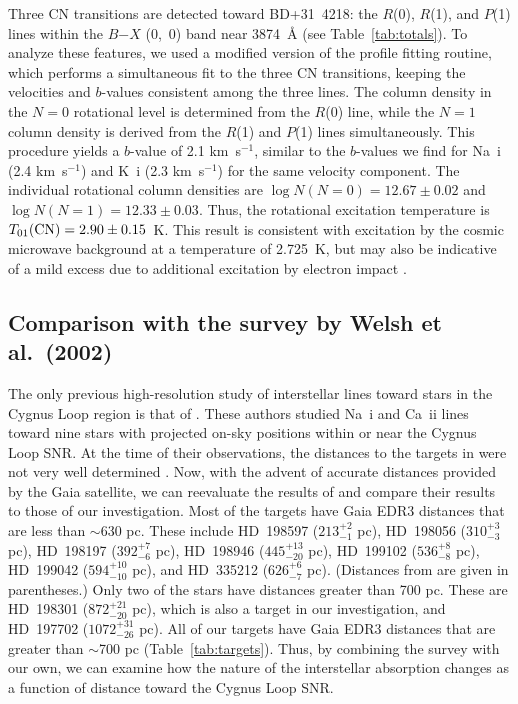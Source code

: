 \documentclass[fleqn,usenatbib]{mnras}
\begin{document}
Three CN transitions are detected toward BD+31~4218: the $R$(0), $R$(1), and $P$(1) lines within the $B$$-$$X$ (0,~0) band near 3874~\AA{} (see Table~\ref{tab:totals}). To analyze these features, we used a modified version of the profile fitting routine, which performs a simultaneous fit to the three CN transitions, keeping the velocities and $b$-values consistent among the three lines. The column density in the $N=0$ rotational level is determined from the $R$(0) line, while the $N=1$ column density is derived from the $R$(1) and $P$(1) lines simultaneously. This procedure yields a $b$-value of 2.1 km~s$^{-1}$, similar to the $b$-values we find for Na~{\sc i} (2.4 km~s$^{-1}$) and K~{\sc i} (2.3 km~s$^{-1}$) for the same velocity component. The individual rotational column densities are $\log N(N=0)=12.67\pm0.02$ and $\log N(N=1)=12.33\pm0.03$. Thus, the rotational excitation temperature is $T_{01}({\rm CN})=2.90\pm0.15$~K. This result is consistent with excitation by the cosmic microwave background at a temperature of 2.725~K, but may also be indicative of a mild excess due to additional excitation by electron impact \citep[e.g.,][]{r11}.

\subsection{Comparison with the survey by Welsh et al.~(2002)}
The only previous high-resolution study of interstellar lines toward stars in the Cygnus Loop region is that of \citet{w02}. These authors studied Na~{\sc i} and Ca~{\sc ii} lines toward nine stars with projected on-sky positions within or near the Cygnus Loop SNR. At the time of their observations, the distances to the targets in \citet{w02} were not very well determined \citep[and the targets were selected assuming the distance to the Cygnus Loop was 440 pc;][]{b99}. Now, with the advent of accurate distances provided by the Gaia satellite, we can reevaluate the results of \citet{w02} and compare their results to those of our investigation. Most of the \citet{w02} targets have Gaia EDR3 distances that are less than $\sim$630 pc. These include HD~198597 ($213^{+2}_{-1}$ pc), HD~198056 ($310^{+3}_{-3}$ pc), HD~198197 ($392^{+7}_{-6}$ pc), HD~198946 ($445^{+13}_{-20}$ pc), HD~199102 ($536^{+8}_{-8}$ pc), HD~199042 ($594^{+10}_{-10}$ pc), and HD~335212 ($626^{+6}_{-7}$ pc). (Distances from \citet{bj21} are given in parentheses.) Only two of the \citet{w02} stars have distances greater than 700 pc. These are HD~198301 ($872^{+21}_{-20}$ pc), which is also a target in our investigation, and HD~197702 ($1072^{+31}_{-26}$ pc). All of our targets have Gaia EDR3 distances that are greater than $\sim$700 pc (Table~\ref{tab:targets}). Thus, by combining the \citet{w02} survey with our own, we can examine how the nature of the interstellar absorption changes as a function of distance toward the Cygnus Loop SNR.
\end{document}
